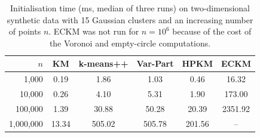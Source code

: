 \begin{table}[htbp]
\centering
\caption{Initialisation time (ms, median of three runs) on two-dimensional synthetic data with 15 Gaussian clusters and an increasing number of points $n$. ECKM was not run for $n=10^6$ because of the cost of the Voronoi and empty-circle computations.}
\label{tab:S6}
\small
\begin{tabular}{|r|ccccc|}
\hline
$n$ & KM & k-means++ & Var-Part & HPKM & ECKM \\
\hline
1,000 & 0.19 & 1.86 & 1.03 & 0.46 & 16.32 \\
10,000 & 0.26 & 4.10 & 5.31 & 1.90 & 173.00 \\
100,000 & 1.39 & 30.88 & 50.28 & 20.39 & 2351.92 \\
1,000,000 & 13.34 & 505.02 & 505.78 & 201.56 & -- \\
\hline
\end{tabular}
\end{table}
